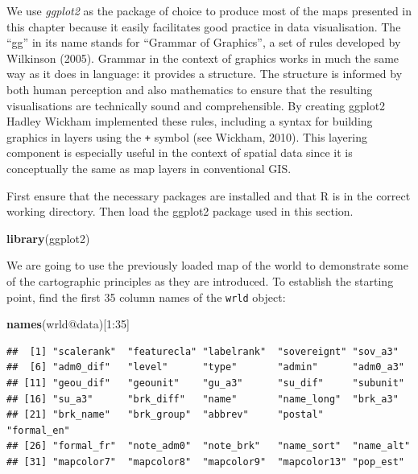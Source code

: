 \documentclass[]{article}
\newenvironment{Shaded}{}{}
\newcommand{\KeywordTok}[1]{\textcolor[rgb]{0.00,0.44,0.13}{\textbf{{#1}}}}
\newcommand{\DecValTok}[1]{\textcolor[rgb]{0.25,0.63,0.44}{{#1}}}
\newcommand{\NormalTok}[1]{{#1}}
\begin{document}
We use \emph{ggplot2} as the package of choice to produce most of the
maps presented in this chapter because it easily facilitates good
practice in data visualisation. The ``gg'' in its name stands for
``Grammar of Graphics'', a set of rules developed by Wilkinson (2005).
Grammar in the context of graphics works in much the same way as it does
in language: it provides a structure. The structure is informed by both
human perception and also mathematics to ensure that the resulting
visualisations are technically sound and comprehensible. By creating
ggplot2 Hadley Wickham implemented these rules, including a syntax for
building graphics in layers using the \texttt{+} symbol (see Wickham,
2010). This layering component is especially useful in the context of
spatial data since it is conceptually the same as map layers in
conventional GIS.

First ensure that the necessary packages are installed and that R is in
the correct working directory. Then load the ggplot2 package used in
this section.

\begin{Shaded}
\begin{Highlighting}[]
\KeywordTok{library}\NormalTok{(ggplot2)}
\end{Highlighting}
\end{Shaded}

We are going to use the previously loaded map of the world to
demonstrate some of the cartographic principles as they are introduced.
To establish the starting point, find the first 35 column names of the
\texttt{wrld} object:

\begin{Shaded}
\begin{Highlighting}[]
\KeywordTok{names}\NormalTok{(wrld@data)[}\DecValTok{1}\NormalTok{:}\DecValTok{35}\NormalTok{]}
\end{Highlighting}
\end{Shaded}

\begin{verbatim}
##  [1] "scalerank"  "featurecla" "labelrank"  "sovereignt" "sov_a3"    
##  [6] "adm0_dif"   "level"      "type"       "admin"      "adm0_a3"   
## [11] "geou_dif"   "geounit"    "gu_a3"      "su_dif"     "subunit"   
## [16] "su_a3"      "brk_diff"   "name"       "name_long"  "brk_a3"    
## [21] "brk_name"   "brk_group"  "abbrev"     "postal"     "formal_en" 
## [26] "formal_fr"  "note_adm0"  "note_brk"   "name_sort"  "name_alt"  
## [31] "mapcolor7"  "mapcolor8"  "mapcolor9"  "mapcolor13" "pop_est"
\end{verbatim}
\end{document}
